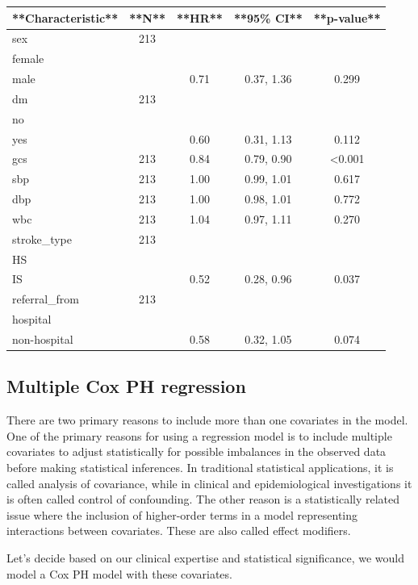 \documentclass[
  10pt,
]{krantz}
\begin{document}
\begin{tabular}{l|c|c|c|c}
\hline
**Characteristic** & **N** & **HR** & **95\% CI** & **p-value**\\
\hline
sex & 213 &  &  & \\
\hline
female &  &  &  & \\
\hline
male &  & 0.71 & 0.37, 1.36 & 0.299\\
\hline
dm & 213 &  &  & \\
\hline
no &  &  &  & \\
\hline
yes &  & 0.60 & 0.31, 1.13 & 0.112\\
\hline
gcs & 213 & 0.84 & 0.79, 0.90 & <0.001\\
\hline
sbp & 213 & 1.00 & 0.99, 1.01 & 0.617\\
\hline
dbp & 213 & 1.00 & 0.98, 1.01 & 0.772\\
\hline
wbc & 213 & 1.04 & 0.97, 1.11 & 0.270\\
\hline
stroke\_type & 213 &  &  & \\
\hline
HS &  &  &  & \\
\hline
IS &  & 0.52 & 0.28, 0.96 & 0.037\\
\hline
referral\_from & 213 &  &  & \\
\hline
hospital &  &  &  & \\
\hline
non-hospital &  & 0.58 & 0.32, 1.05 & 0.074\\
\hline
\end{tabular}

\hypertarget{multiple-cox-ph-regression}{%
\subsection{Multiple Cox PH regression}\label{multiple-cox-ph-regression}}

There are two primary reasons to include more than one covariates in the model. One of the primary reasons for using a regression model is to include multiple covariates to adjust statistically for possible imbalances in the observed data before making statistical inferences. In traditional statistical applications, it is called analysis of covariance, while in clinical and epidemiological investigations it is often called control of confounding. The other reason is a statistically related issue where the inclusion of higher-order terms in a model representing interactions between covariates. These are also called effect modifiers.

Let's decide based on our clinical expertise and statistical significance, we would model a Cox PH model with these covariates.
\end{document}
